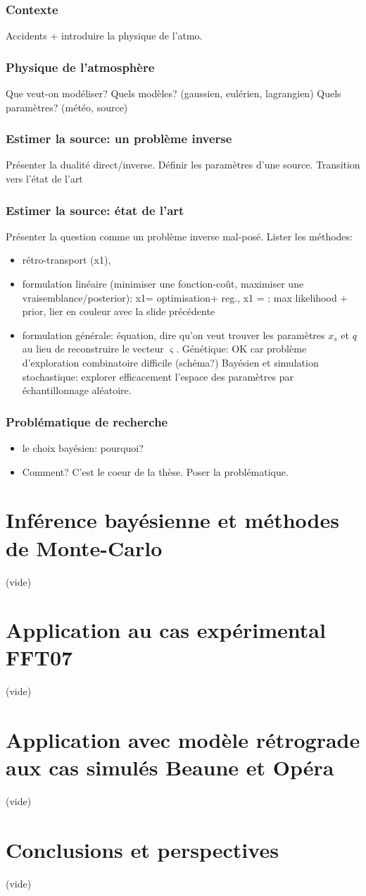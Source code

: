 \documentclass{beamer}
\begin{document}
\begin{frame}
	\frametitle{Contexte}
	Accidents + introduire la physique de l'atmo.
\end{frame}
\begin{frame}
	\frametitle{Physique de l'atmosphère}
	Que veut-on modéliser? Quels modèles? (gaussien, eulérien, lagrangien) Quels paramètres? (météo, source)
\end{frame}
\begin{frame}
	\frametitle{Estimer la source: un problème inverse}
	Présenter la dualité direct/inverse. Définir les paramètres d'une source. Transition vers l'état de l'art
\end{frame}
\begin{frame}
	\frametitle{Estimer la source: état de l'art}
	Présenter la question comme un problème inverse mal-posé. Lister les méthodes:
	\begin{itemize}
		\item rétro-transport (x1),
		\item formulation linéaire (minimiser une fonction-coût, maximiser une vraisemblance/posterior): x1= optimisation+ reg., x1 = : max likelihood + prior, lier en couleur avec la slide précédente
		\item formulation générale: équation, dire qu'on veut trouver les paramètres $x_s$ et $q$ au lieu de reconstruire le vecteur $\varsigma$. Génétique: OK car problème d'exploration combinatoire difficile (schéma?) Bayésien et simulation stochastique: explorer efficacement l'espace des paramètres par échantillonnage aléatoire.
	\end{itemize} 
\end{frame}
\begin{frame}
	\frametitle{Problématique de recherche}
	\begin{itemize}
		\item le choix bayésien: pourquoi?
		\item Comment? C'est le coeur de la thèse. Poser la problématique.
	\end{itemize}
\end{frame}
\section{Inférence bayésienne et méthodes de Monte-Carlo}
\begin{frame}
	(vide)
\end{frame}
\section{Application au cas expérimental FFT07}
\begin{frame}
	(vide)
\end{frame}
\section{Application avec modèle rétrograde aux cas simulés Beaune et Opéra}
\begin{frame}
	(vide)
\end{frame}
\section{Conclusions et perspectives}
\begin{frame}
	(vide)
\end{frame}
\end{document}
